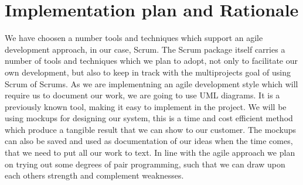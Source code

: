 \section*{Implementation plan and Rationale}
We have choosen a number tools and techniques which support an agile development approach, in our case, Scrum.
The Scrum package itself carries a number of tools and techniques which we plan to adopt, not only to facilitate our own development, but also to keep in track 
with the multiprojects goal of using Scrum of Scrums.
As we are implementning an agile development style which will require us to document our work, we are going to use UML diagrams. It is a previously known tool, making it easy to
implement in the project. We will be using mockups for designing our system, this is a time and cost efficient method which produce a tangible result that we can show to our customer.
The mockups can also be saved and used as documentation of our ideas when the time comes, that we need to put all our work to text.
In line with the agile approach we plan on trying out some degrees of pair programming, such that we can draw upon each others strength and complement weaknesses.




